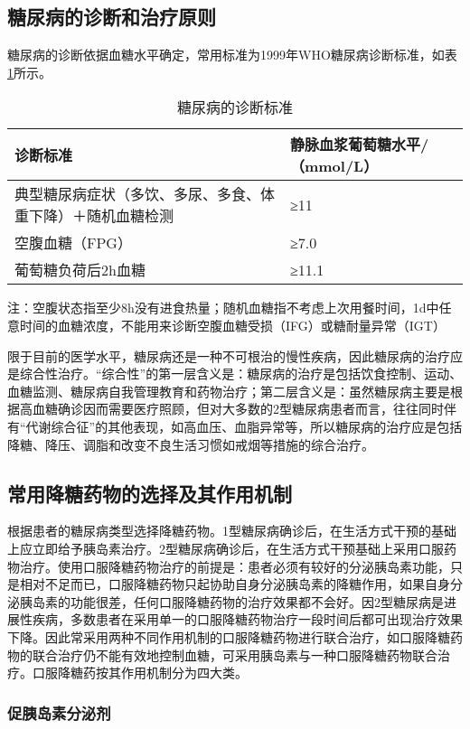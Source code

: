 \subsection{糖尿病的诊断和治疗原则}

糖尿病的诊断依据血糖水平确定，常用标准为1999年WHO糖尿病诊断标准，如表\ref{tab18-1}所示。　

\begin{longtable}[]{p{6cm}p{6cm}}
    \caption{糖尿病的诊断标准}
    \label{tab18-1}\\
\toprule
诊断标准 & 静脉血浆葡萄糖水平/（mmol/L）\tabularnewline
\midrule
\endhead
典型糖尿病症状（多饮、多尿、多食、体重下降）＋随机血糖检测 &
≥11\tabularnewline
空腹血糖（FPG） & ≥7.0\tabularnewline
葡萄糖负荷后2h血糖 & ≥11.1\tabularnewline
\bottomrule
\end{longtable}

注：空腹状态指至少8h没有进食热量；随机血糖指不考虑上次用餐时间，1d中任意时间的血糖浓度，不能用来诊断空腹血糖受损（IFG）或糖耐量异常（IGT）

限于目前的医学水平，糖尿病还是一种不可根治的慢性疾病，因此糖尿病的治疗应是综合性治疗。“综合性”的第一层含义是：糖尿病的治疗是包括饮食控制、运动、血糖监测、糖尿病自我管理教育和药物治疗；第二层含义是：虽然糖尿病主要是根据高血糖确诊因而需要医疗照顾，但对大多数的2型糖尿病患者而言，往往同时伴有“代谢综合征”的其他表现，如高血压、血脂异常等，所以糖尿病的治疗应是包括降糖、降压、调脂和改变不良生活习惯如戒烟等措施的综合治疗。

\subsection{常用降糖药物的选择及其作用机制}

根据患者的糖尿病类型选择降糖药物。1型糖尿病确诊后，在生活方式干预的基础上应立即给予胰岛素治疗。2型糖尿病确诊后，在生活方式干预基础上采用口服药物治疗。使用口服降糖药物治疗的前提是：患者必须有较好的分泌胰岛素功能，只是相对不足而已，口服降糖药物只起协助自身分泌胰岛素的降糖作用，如果自身分泌胰岛素的功能很差，任何口服降糖药物的治疗效果都不会好。因2型糖尿病是进展性疾病，多数患者在采用单一的口服降糖药物治疗一段时间后都可出现治疗效果下降。因此常采用两种不同作用机制的口服降糖药物进行联合治疗，如口服降糖药物的联合治疗仍不能有效地控制血糖，可采用胰岛素与一种口服降糖药物联合治疗。口服降糖药按其作用机制分为四大类。

\subsubsection{促胰岛素分泌剂}
